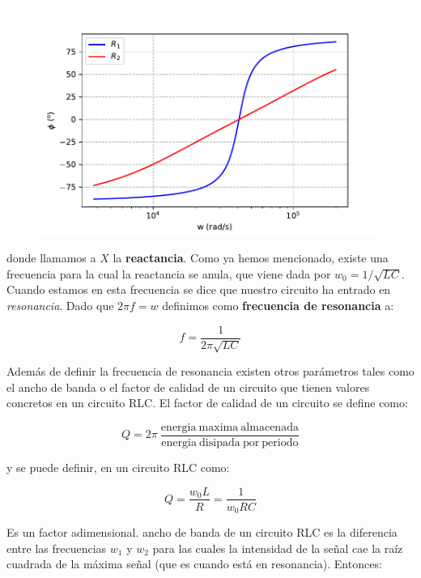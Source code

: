 \documentclass[12pt,a4paper]{article}
\begin{document}
\begin{figure}[h!] \centering
\includegraphics[scale=0.8]{desfase.pdf}
\end{figure}


donde llamamos a $X$ la \textbf{reactancia}. Como ya hemos mencionado, existe una frecuencia para la cual la reactancia se anula, que viene dada por $w_0 = 1/\sqrt{LC}$. Cuando estamos en esta frecuencia se dice que nuestro circuito ha entrado en \textit{resonancia}. Dado que $2 \pi f = w$ definimos como \textbf{frecuencia de resonancia} a:

\begin{equation}
f = \dfrac{1}{2 \pi \sqrt{LC}}
\end{equation}




Además de definir la frecuencia de resonancia existen otros parámetros tales como el ancho de banda o el factor de calidad de un circuito que tienen valores concretos en un circuito RLC. El factor de calidad de un circuito se define como:

\begin{equation}
Q  = 2 \pi \ \dfrac{\mathrm{energia \ maxima \ almacenada}}{\mathrm{energia \ disipada \ por \ periodo}}
\end{equation}

y se puede definir, en un circuito RLC como:

\begin{equation}
Q = \dfrac{w_0 L}{R} = \dfrac{1}{w_0 RC}
\end{equation}

Es un factor adimensional. ancho de banda de un circuito RLC es la diferencia entre las frecuencias $w_1$ y $w_2$ para las cuales la intensidad de la señal cae la raíz cuadrada de la máxima señal (que es cuando está en resonancia). Entonces:
\end{document}
